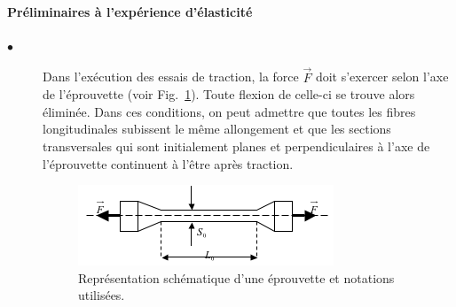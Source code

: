 \documentclass[lecture.tex]{subfiles}
\begin{document}
\paragraph*{Préliminaires à l'expérience d'élasticité}

\begin{description}
  \item[$\bullet$] Dans l'exécution des essais de traction, la force $\vec{F}$ doit s'exercer selon l'axe de l'éprouvette (voir Fig.~\ref{Fig_Eprouvette}). Toute flexion de celle-ci se trouve alors éliminée. Dans ces conditions, on peut admettre que toutes les fibres longitudinales subissent le même allongement et que les sections transversales qui sont initialement planes et perpendiculaires à l'axe de l'éprouvette continuent à l'être après traction.
\begin{figure}[h!]
\begin{center}
\includegraphics[scale=0.8]{Fig_Schema.png}
\caption{Représentation schématique d'une éprouvette et notations utilisées.}
\label{Fig_Eprouvette}
\end{center}
\end{figure}



\end{description}
\end{document}
